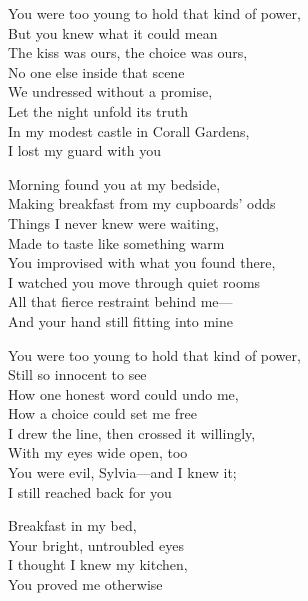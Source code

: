 \begin{lyrics}
You were too young to hold that kind of power,\\
But you knew what it could mean\\
The kiss was ours, the choice was ours,\\
No one else inside that scene\\
We undressed without a promise,\\
Let the night unfold its truth\\
In my modest castle in Corall Gardens,\\
I lost my guard with you

Morning found you at my bedside,\\
Making breakfast from my cupboards’ odds\\
Things I never knew were waiting,\\
Made to taste like something warm\\
You improvised with what you found there,\\
I watched you move through quiet rooms\\
All that fierce restraint behind me—\\
And your hand still fitting into mine

You were too young to hold that kind of power,\\
Still so innocent to see\\
How one honest word could undo me,\\
How a choice could set me free\\
I drew the line, then crossed it willingly,\\
With my eyes wide open, too\\
You were evil, Sylvia—and I knew it;\\
I still reached back for you

Breakfast in my bed,\\
Your bright, untroubled eyes\\
I thought I knew my kitchen,\\
You proved me otherwise
\end{lyrics}

